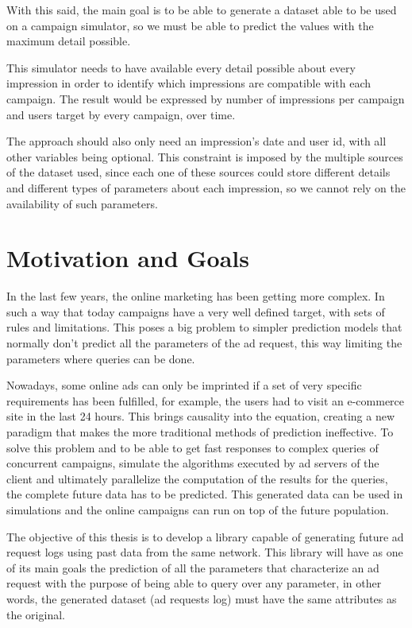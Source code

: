 \documentclass[9pt,a4paper]{extarticle}
\begin{document}
\begin{multicols}{2}
With this said, the main goal is to be able to generate a dataset able to be used on a campaign
simulator, so we must be able to predict the values with the maximum detail
possible.

This simulator needs to have available every detail possible about every
impression in order to identify which impressions are compatible with each
campaign. The result would be expressed by number of impressions per campaign and
users target by every campaign, over time.

The approach should also only need an impression's date and user id, with all
other variables being optional.
This constraint is imposed by the multiple sources of the dataset used, since
each one of these sources could store different details and different types of
parameters about each impression, so we cannot rely on the availability of
such parameters.

\section{Motivation and Goals} \label{sec:goals}

In the last few years, the online marketing has been getting more complex. In
such a way that today campaigns have a very well defined target, with
sets of rules and limitations. This poses a big problem to
simpler prediction models that normally don't predict all the parameters of the
ad request, this way limiting the parameters where queries can be done.

Nowadays, some online ads can only be imprinted if a set of very specific requirements has been fulfilled, for example,
the users had to visit an e-commerce site in the last 24 hours. This brings causality into the equation, creating a new paradigm that makes 
the more traditional methods of prediction ineffective. To solve this problem
and to be able to get fast responses to complex queries of concurrent campaigns,
simulate the algorithms executed by ad servers of the client
and ultimately parallelize the computation of the results for the
queries,
the complete future data has to be predicted. This generated data
can be used in simulations and the online campaigns can run on top of the future population.

The objective of this thesis is to develop a library capable of generating
future ad request logs using past data from the same network.
This library will have as one of its main goals the prediction of all the parameters that characterize an
ad request with the purpose of being able to query over any parameter, in other
words, the generated dataset (ad requests log) must have the same attributes as the original.


\end{multicols}
\end{document}
